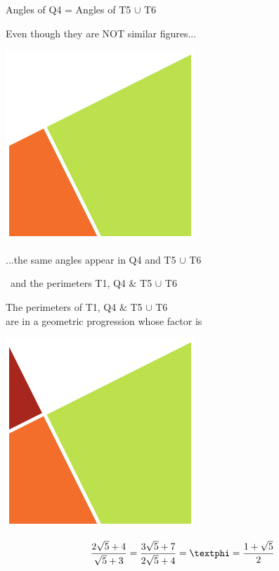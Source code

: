 \documentclass[14pt]{beamer}
\begin{document}

    \begin{frame}{Angles of Q4 = Angles of T5 $\cup$ T6}
        \begin{center}
            Even though they are NOT similar figures...
            \bigskip \bigskip

            \includegraphics[height=20ex]{figures/figure001g.pdf}

            \bigskip \bigskip

            ...the same angles appear in Q4 and T5 $\cup$ T6
        \end{center}
    \end{frame}


    \begin{frame}{\textphi\ and the perimeters T1, Q4 \& T5 $\cup$ T6}
        \begin{center}
            The perimeters of T1, Q4 \& T5 $\cup$ T6\\are in a geometric progression whose factor is \textphi

            \bigskip \bigskip

            \includegraphics[height=15ex]{figures/figure001h.pdf}

            $$\frac{2\sqrt{5} + 4}{\sqrt{5} + 3} = \frac{3\sqrt{5} + 7}{2\sqrt{5} + 4} = \text{\textphi} = \frac{1+\sqrt{5}}{2}$$
        \end{center}
    \end{frame}

\end{document}
